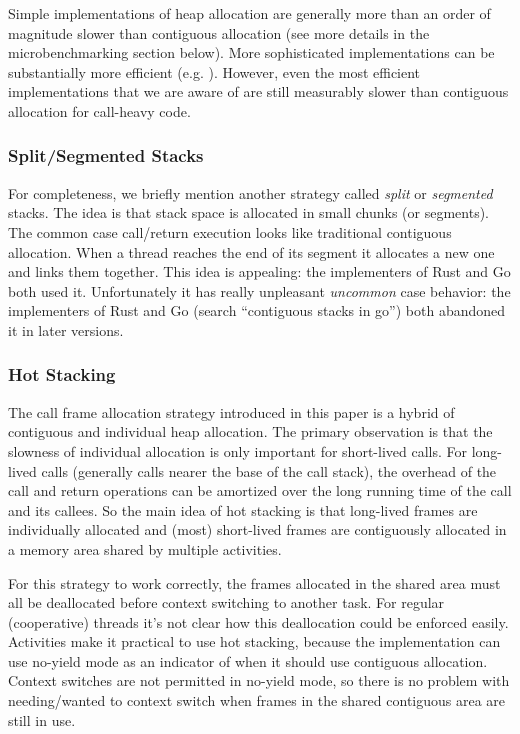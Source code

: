 \documentclass[pldi,10pt,preprint]{sigplanconf-pldi16}
\begin{document}
Simple implementations of heap allocation are generally more than an order of magnitude slower than contiguous allocation (see more details in the microbenchmarking section below).
More sophisticated implementations can be substantially more efficient (e.g. \cite{Shao2000}).
However, even the most efficient implementations that we are aware of are still measurably slower than contiguous allocation for call-heavy code.

\subsubsection{Split/Segmented Stacks}

For completeness, we briefly mention another strategy called \emph{split} or \emph{segmented} stacks.
The idea is that stack space is allocated in small chunks (or segments).
The common case call/return execution looks like traditional contiguous allocation.
When a thread reaches the end of its segment it allocates a new one and links them together.
This idea is appealing: the implementers of Rust and Go both used it.
Unfortunately it has really unpleasant \emph{uncommon} case behavior: the implementers of Rust \cite{Anderson2013} and Go (search ``contiguous stacks in go'') both abandoned it in later versions.


\subsubsection{Hot Stacking}

The call frame allocation strategy introduced in this paper is a hybrid of contiguous and individual heap allocation.
The primary observation is that the slowness of individual allocation is only important for short-lived calls.
For long-lived calls (generally calls nearer the base of the call stack), the overhead of the call and return operations can be amortized over the long running time of the call and its callees.
So the main idea of hot stacking is that long-lived frames are individually allocated and (most) short-lived frames are contiguously allocated in a memory area shared by multiple activities.

For this strategy to work correctly, the frames allocated in the shared area must all be deallocated before context switching to another task.
For regular (cooperative) threads it's not clear how this deallocation could be enforced easily.
Activities make it practical to use hot stacking, because the implementation can use no-yield mode as an indicator of when it should use contiguous allocation.
Context switches are not permitted in no-yield mode, so there is no problem with needing/wanted to context switch when frames in the shared contiguous area are still in use.
\end{document}
